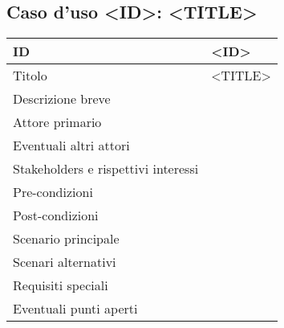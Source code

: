 \documentclass[../../main.tex]{subfiles}
\begin{document}
\subsection{Caso d’uso <ID>: <TITLE>}
\begin{tabularx}{150mm}{|l|X|}
    \hline
    ID                                  & \textbf{<ID>}\\
    \hline
    Titolo                              & <TITLE>\\
    \hline
    Descrizione breve                   &    \\
    \hline
    Attore primario                     &    \\
    \hline
    Eventuali altri attori              &    \\
    \hline
    Stakeholders e rispettivi interessi &    \\
    \hline
    Pre-condizioni                      &    \\
    \hline
    Post-condizioni                     &    \\
    \hline
    Scenario principale                 &    \\
    \hline
    Scenari alternativi                 &    \\
    \hline
    Requisiti speciali                  &    \\
    \hline
    Eventuali punti aperti              &    \\
    \hline
\end{tabularx}
\newpage
\end{document}
